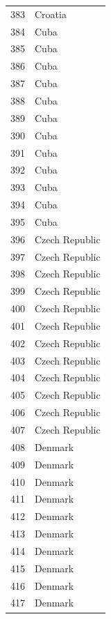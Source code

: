 \documentclass[
  letterpaper,
  DIV=11,
  numbers=noendperiod]{scrreprt}
\begin{document}
\begin{tabular}{ll}
383  &                   Croatia \\
384  &                      Cuba \\
385  &                      Cuba \\
386  &                      Cuba \\
387  &                      Cuba \\
388  &                      Cuba \\
389  &                      Cuba \\
390  &                      Cuba \\
391  &                      Cuba \\
392  &                      Cuba \\
393  &                      Cuba \\
394  &                      Cuba \\
395  &                      Cuba \\
396  &            Czech Republic \\
397  &            Czech Republic \\
398  &            Czech Republic \\
399  &            Czech Republic \\
400  &            Czech Republic \\
401  &            Czech Republic \\
402  &            Czech Republic \\
403  &            Czech Republic \\
404  &            Czech Republic \\
405  &            Czech Republic \\
406  &            Czech Republic \\
407  &            Czech Republic \\
408  &                   Denmark \\
409  &                   Denmark \\
410  &                   Denmark \\
411  &                   Denmark \\
412  &                   Denmark \\
413  &                   Denmark \\
414  &                   Denmark \\
415  &                   Denmark \\
416  &                   Denmark \\
417  &                   Denmark \\

\end{tabular}
\end{document}
